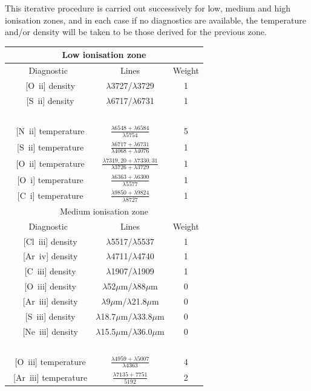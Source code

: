 \documentclass[useAMS,usenatbib]{mn2e}
\begin{document}
This iterative procedure is carried out successively for low, medium and high ionisation zones, and in each case if no diagnostics are available, the temperature and/or density will be taken to be those derived for the previous zone.

\begin{table}
\begin{tabular}{ccc}
\hline
\multicolumn{3}{c}{Low ionisation zone}\\
\hline
Diagnostic & Lines & Weight \\
~[O~{\sc ii}] density & $\lambda$3727/$\lambda$3729 & 1 \\
~[S~{\sc ii}] density & $\lambda$6717/$\lambda$6731 & 1 \\
~\\
~[N~{\sc ii}] temperature & $\frac{\lambda 6548 + \lambda 6584}{\lambda 5754}$ & 5 \\
~[S~{\sc ii}] temperature & $\frac{\lambda 6717 + \lambda 6731}{\lambda 4068 +  \lambda 4076}$ & 1 \\
~[O~{\sc ii}] temperature & $\frac{\lambda 7319,20 + \lambda 7330,31}{\lambda 3726 + \lambda 3729}$ & 1 \\
~[O~{\sc i}] temperature & $\frac{\lambda 6363 + \lambda 6300}{\lambda 5577}$ & 1 \\
~[C~{\sc i}] temperature & $\frac{\lambda 9850 + \lambda 9824}{\lambda 8727}$ & 1 \\
\hline
\multicolumn{3}{c}{Medium ionisation zone}\\
\hline
Diagnostic & Lines & Weight \\
~[Cl~{\sc iii}] density & $\lambda$5517/$\lambda$5537 & 1 \\
~[Ar~{\sc iv}] density & $\lambda$4711/$\lambda$4740 & 1 \\
~[C~{\sc iii}] density & $\lambda$1907/$\lambda$1909 & 1 \\
~[O~{\sc iii}] density & $\lambda$52$\mu$m/$\lambda$88$\mu$m & 0 \\
~[Ar~{\sc iii}] density & $\lambda$9$\mu$m/$\lambda$21.8$\mu$m & 0 \\
~[S~{\sc iii}] density & $\lambda$18.7$\mu$m/$\lambda$33.8$\mu$m & 0 \\
~[Ne~{\sc iii}] density & $\lambda$15.5$\mu$m/$\lambda$36.0$\mu$m & 0 \\
~\\
~[O~{\sc iii}] temperature & $\frac{\lambda 4959 + \lambda 5007}{\lambda 4363}$ & 4\\
~[Ar~{\sc iii}] temperature & $\frac{\lambda 7135 + 7751}{5192}$ & 2\\

\end{tabular}
\end{table}
\end{document}
